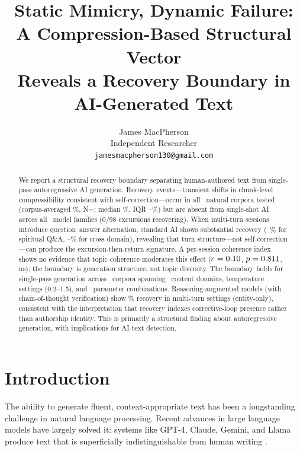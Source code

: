 \documentclass[11pt]{article}
\title{Static Mimicry, Dynamic Failure: A Compression-Based Structural Vector\\ Reveals a Recovery Boundary in AI-Generated Text}
\author{
  James MacPherson \\
  Independent Researcher \\
  \texttt{jamesmacpherson130@gmail.com}
}
\begin{document}
\maketitle


\begin{abstract}
We report a structural recovery boundary separating human-authored text from single-pass autoregressive AI generation. Recovery events---transient shifts in chunk-level compressibility consistent with self-correction---occur in all \nNatural\ natural corpora tested (corpus-averaged \recNatCorpusAvg\%, N=\nNatural; median \recNatMedian\%, IQR \recNatIQRlo--\recNatIQRhi\%) but are absent from single-shot AI across all \nModels\ model families (0/98 excursions recovering). When multi-turn sessions introduce question--answer alternation, standard AI shows substantial recovery (\recClaudeMT--\recGPTMT\% for spiritual Q\&A, \recMTXdomMin--\recMTXdomMax\% for cross-domain), revealing that turn structure---not self-correction---can produce the excursion-then-return signature. A per-session coherence index shows no evidence that topic coherence moderates this effect ($r = 0.10$, $p = 0.811$, ns); the boundary is generation structure, not topic diversity. The boundary holds for single-pass generation across \nCorpora\ corpora spanning \nDomains\ content domains, temperature settings (0.2--1.5), and \nSensitivityCombos\ parameter combinations. Reasoning-augmented models (with chain-of-thought verification) show \recReasoningEntity\% recovery in multi-turn settings (entity-only), consistent with the interpretation that recovery indexes corrective-loop presence rather than authorship identity. This is primarily a structural finding about autoregressive generation, with implications for AI-text detection.
\end{abstract}


\section{Introduction}

The ability to generate fluent, context-appropriate text has been a longstanding challenge in natural language processing. Recent advances in large language models have largely solved it: systems like GPT-4, Claude, Gemini, and Llama produce text that is superficially indistinguishable from human writing \cite{tang2024survey,sadasivan2024aigenerated,mitchell2023detectgpt}.
\end{document}
